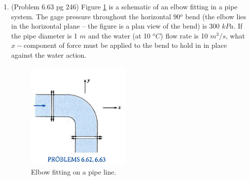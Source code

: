 \documentclass[12pt]{article}
\begin{document}
\begin{enumerate}
\item (Problem 6.63 pg 246) Figure \ref{fig:PipeBend} is a schematic of an elbow fitting in a pipe system.  The gage pressure throughout the horizontal 90$^o$ bend (the elbow lies in the horizontal plane -- the figure is a plan view of the bend) is 300 $kPa$.  
If the pipe diameter is 1 $m$ and the water (at 10 $^oC$) flow rate is 10 $m^3/s$, what $x-$component of force must be applied to the bend to hold in in place against the water action.

\begin{figure}[h!] %
   \centering
   \includegraphics[width=2in]{PipeBend.jpg} 
   \caption{Elbow fitting on a pipe line.}
   \label{fig:PipeBend}
\end{figure}


\end{enumerate}
\end{document}
